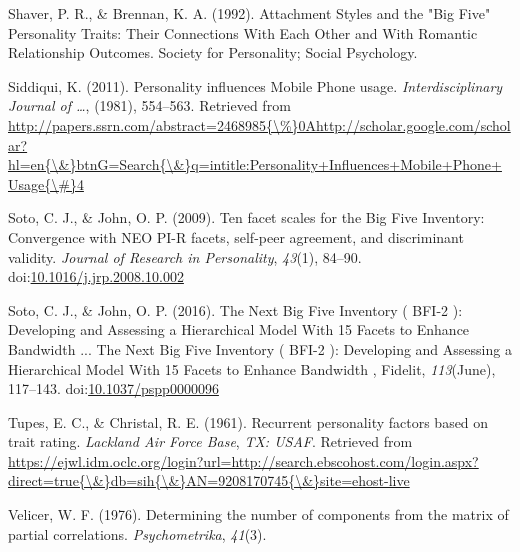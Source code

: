 \documentclass[,man]{apa6}
\theoremstyle{definition}
\theoremstyle{definition}
\theoremstyle{definition}
\theoremstyle{remark}
\begin{document}
\leavevmode\hypertarget{ref-Shaver1992}{}%
Shaver, P. R., \& Brennan, K. A. (1992). Attachment Styles and the "Big
Five" Personality Traits: Their Connections With Each Other and With
Romantic Relationship Outcomes. Society for Personality; Social
Psychology.

\leavevmode\hypertarget{ref-Siddiqui2011}{}%
Siddiqui, K. (2011). Personality influences Mobile Phone usage.
\emph{Interdisciplinary Journal of \ldots{}}, (1981), 554--563.
Retrieved from
\href{http://papers.ssrn.com/abstract=2468985\%7B/\%\%7D0Ahttp://scholar.google.com/scholar?hl=en\%7B/\&\%7DbtnG=Search\%7B/\&\%7Dq=intitle:Personality+Influences+Mobile+Phone+Usage\%7B/\#\%7D4}{http://papers.ssrn.com/abstract=2468985\{\textbackslash{}\%\}0Ahttp://scholar.google.com/scholar?hl=en\{\textbackslash{}\&\}btnG=Search\{\textbackslash{}\&\}q=intitle:Personality+Influences+Mobile+Phone+Usage\{\textbackslash{}\#\}4}

\leavevmode\hypertarget{ref-SotoJohn2009}{}%
Soto, C. J., \& John, O. P. (2009). Ten facet scales for the Big Five
Inventory: Convergence with NEO PI-R facets, self-peer agreement, and
discriminant validity. \emph{Journal of Research in Personality},
\emph{43}(1), 84--90.
doi:\href{https://doi.org/10.1016/j.jrp.2008.10.002}{10.1016/j.jrp.2008.10.002}

\leavevmode\hypertarget{ref-SotoJohn2016}{}%
Soto, C. J., \& John, O. P. (2016). The Next Big Five Inventory ( BFI-2
): Developing and Assessing a Hierarchical Model With 15 Facets to
Enhance Bandwidth ... The Next Big Five Inventory ( BFI-2 ): Developing
and Assessing a Hierarchical Model With 15 Facets to Enhance Bandwidth ,
Fidelit, \emph{113}(June), 117--143.
doi:\href{https://doi.org/10.1037/pspp0000096}{10.1037/pspp0000096}

\leavevmode\hypertarget{ref-TupesChristal1961}{}%
Tupes, E. C., \& Christal, R. E. (1961). Recurrent personality factors
based on trait rating. \emph{Lackland Air Force Base}, \emph{TX: USAF}.
Retrieved from
\href{https://ejwl.idm.oclc.org/login?url=http://search.ebscohost.com/login.aspx?direct=true\%7B/\&\%7Ddb=sih\%7B/\&\%7DAN=9208170745\%7B/\&\%7Dsite=ehost-live}{https://ejwl.idm.oclc.org/login?url=http://search.ebscohost.com/login.aspx?direct=true\{\textbackslash{}\&\}db=sih\{\textbackslash{}\&\}AN=9208170745\{\textbackslash{}\&\}site=ehost-live}

\leavevmode\hypertarget{ref-Velicer1976}{}%
Velicer, W. F. (1976). Determining the number of components from the
matrix of partial correlations. \emph{Psychometrika}, \emph{41}(3).
\end{document}
